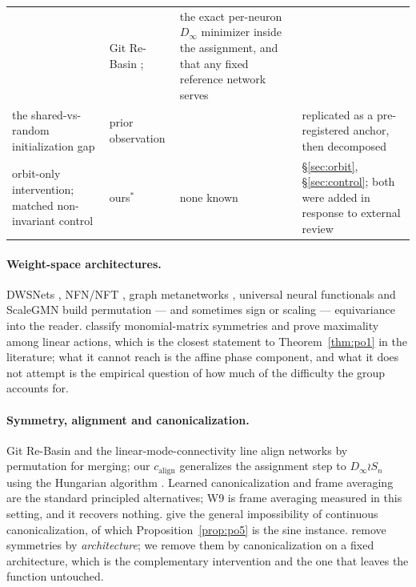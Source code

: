 \documentclass[10pt,letterpaper]{article}
\theoremstyle{definition}
\newcommand{\Dinf}{D_\infty}
\newcommand{\calign}{c_{\mathrm{align}}}
\begin{document}
\begin{table}[t]
\begin{tabular}{@{}L{3.35cm}L{1.75cm}L{3.35cm}L{4.3cm}@{}}
 & Git Re-Basin \citep{ainsworth2023rebasin}; \citet{entezari2022lmc}
 & the exact per-neuron $\Dinf$ minimizer inside the assignment, and that any fixed reference
   network serves \\
\addlinespace[2pt]
the shared-vs-random initialization gap
 & prior observation
 & \citet{deluigi2023inr2vec,papa2024howtotrain}
 & replicated as a pre-registered anchor, then decomposed \\
\addlinespace[2pt]
orbit-only intervention; matched non-invariant control
 & ours$^\ast$
 & none known
 & \S\ref{sec:orbit}, \S\ref{sec:control}; both were added in response to external review \\
\bottomrule
\end{tabular}
\end{table}

\paragraph{Weight-space architectures.} DWSNets \citep{navon2023dws}, NFN/NFT
\citep{zhou2023nfn,zhou2023nft}, graph metanetworks \citep{lim2024gmn,kofinas2024graph},
universal neural functionals \citep{zhou2024unf} and ScaleGMN \citep{kalogeropoulos2024scalegmn}
build permutation --- and sometimes sign or scaling --- equivariance into the reader.
\citet{tran2024monomial} classify monomial-matrix symmetries and prove maximality among linear
actions, which is the closest statement to Theorem~\ref{thm:po1} in the literature; what it cannot
reach is the affine phase component, and what it does not attempt is the empirical question of how
much of the difficulty the group accounts for.

\paragraph{Symmetry, alignment and canonicalization.} Git Re-Basin \citep{ainsworth2023rebasin}
and the linear-mode-connectivity line \citep{entezari2022lmc} align networks by permutation for
merging; our $\calign$ generalizes the assignment step to $\Dinf \wr S_n$ using the Hungarian
algorithm \citep{kuhn1955hungarian}. Learned canonicalization \citep{kaba2023canonicalization} and
frame averaging \citep{puny2022frame} are the standard principled alternatives; W9 is frame
averaging measured in this setting, and it recovers nothing. \citet{dym2024impossibility} give the
general impossibility of continuous canonicalization, of which Proposition~\ref{prop:po5} is the
sine instance. \citet{lim2024empirical} remove symmetries by \emph{architecture}; we remove them
by canonicalization on a fixed architecture, which is the complementary intervention and the one
that leaves the function untouched.
\end{document}
